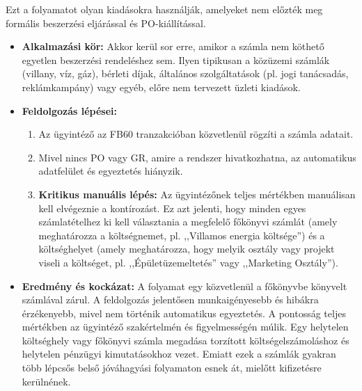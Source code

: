 Ezt a folyamatot olyan kiadásokra használják, amelyeket nem előzték meg formális beszerzési eljárással és PO-kiállítással.
\begin{itemize}
    \item \textbf{Alkalmazási kör:} Akkor kerül sor erre, amikor a számla nem köthető egyetlen beszerzési rendeléshez sem.
    Ilyen tipikusan a közüzemi számlák (villany, víz, gáz), bérleti díjak, általános szolgáltatások (pl. jogi tanácsadás, reklámkampány) vagy egyéb, előre nem tervezett üzleti kiadások.
    \item \textbf{Feldolgozás lépései:}
        \begin{enumerate}
            \item Az ügyintéző az FB60 tranzakcióban közvetlenül rögzíti a számla adatait.
            \item Mivel nincs PO vagy GR, amire a rendszer hivatkozhatna, az automatikus adatfelület és egyeztetés hiányzik.
            \item \textbf{Kritikus manuális lépés:} Az ügyintézőnek teljes mértékben manuálisan kell elvégeznie a kontírozást.
            Ez azt jelenti, hogy minden egyes számlatételhez ki kell választania a megfelelő főkönyvi számlát (amely meghatározza a költségnemet, pl. ,,Villamos energia költsége'') és a költséghelyet (amely meghatározza, hogy melyik osztály vagy projekt viseli a költséget, pl. ,,Épületüzemeltetés'' vagy ,,Marketing Osztály'').
        \end{enumerate}
    \item \textbf{Eredmény és kockázat:} A folyamat egy közvetlenül a főkönyvbe könyvelt számlával zárul.
    A feldolgozás jelentősen munkaigényesebb és hibákra érzékenyebb, mivel nem történik automatikus egyeztetés.
    A pontosság teljes mértékben az ügyintéző szakértelmén és figyelmességén múlik.
    Egy helytelen költséghely vagy főkönyvi számla megadása torzított költségelszámoláshoz és helytelen pénzügyi kimutatásokhoz vezet.
    Emiatt ezek a számlák gyakran több lépcsős belső jóváhagyási folyamaton esnek át, mielőtt kifizetésre kerülnének.
\end{itemize}

